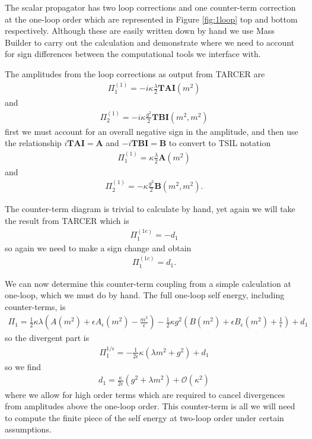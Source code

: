 \documentclass[11pt]{article}
\newcommand{\mb}{\textsf{Mass Builder} \! }
\newcommand{\tsil}{\textsf{TSIL} \! }
\newcommand{\tarcer}{\textsf{TARCER} \! }
\begin{document}
The scalar propagator has two loop corrections and one counter-term correction at the one-loop order which are represented in Figure \ref{fig:1loop} top and bottom respectively.  Although these are easily written down by hand we use \mb to carry out the calculation and demonstrate where we need to account for sign differences between the computational tools we interface with.

The amplitudes from the loop corrections as output from \tarcer are
\begin{align}
\Pi^{(1)}_1 = -i \kappa \frac{\lambda}{2} \mathbf{TAI}(m^2)
\end{align}
and
\begin{align}
\Pi^{(1)}_2 =-i \kappa \frac{g^2}{2} \mathbf{TBI}(m^2,m^2)
\end{align}
first we must account for an overall negative sign in the amplitude, and then use the relationship $i\mathbf{TAI} = \mathbf{A}$ and $-i\mathbf{TBI} = \mathbf{B}$ to convert to \tsil notation
\begin{align}
\Pi^{(1)}_1 = \kappa \frac{\lambda}{2} \mathbf{A}(m^2)
\end{align}
and
\begin{align}
\Pi^{(1)}_2 = -\kappa \frac{g^2}{2} \mathbf{B}(m^2,m^2).
\end{align}

The counter-term diagram is trivial to calculate by hand, yet again we will take the result from \tarcer which is
\begin{align}
\Pi^{(1c)}_1 =  -d_1
\end{align}
so again we need to make a sign change and obtain
\begin{align}
\Pi^{(1c)}_1=  d_1.
\end{align}


We can now determine this counter-term coupling from a simple calculation at one-loop, which we must do by hand.  The full one-loop self energy, including counter-terms, is
 \begin{align}
 \Pi_1 = \frac{1}{2}\kappa\lambda\left(A(m^2)+\epsilon A_{\epsilon}(m^2)-\frac{m^2}{\epsilon}\right)- \frac{1}{2}\kappa g^2\left(B(m^2)+\epsilon B_{\epsilon}(m^2)+\frac{1}{\epsilon}\right)+d_1
 \end{align}
so the divergent part is
\begin{align}
\Pi_1^{1/\epsilon}=  -\frac{1}{2\epsilon}\kappa\left(\lambda m^2+g^2\right)+d_1
\end{align}
so we find
\begin{align}
d_1=\frac{\kappa}{2\epsilon} \left(g^2+\lambda m^2\right)+\mathcal{O}(\kappa^2)
\end{align}
where we allow for high order terms which are required to cancel divergences from amplitudes above the one-loop order.  This counter-term is all we will need to compute the finite piece of the self energy at two-loop order under certain assumptions.
\end{document}
